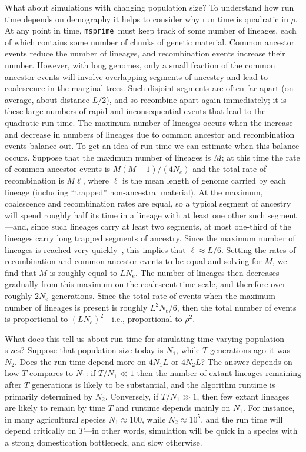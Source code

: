 \documentclass[9pt,twocolumn,twoside,lineno]{gsajnl}
\newcommand{\msprime}[0]{\texttt{msprime}}
\begin{document}
What about simulations with changing population size?
To understand how run time depends on demography
it helps to consider why run time is quadratic in $\rho$.
At any point in time, \msprime\ must keep track of some number of lineages,
each of which contains some number of chunks of genetic material.
Common ancestor events reduce the number of lineages,
and recombination events increase their number.
However, with long genomes,
only a small fraction of the common ancestor events
will involve overlapping segments of ancestry
and lead to coalescence in the marginal trees.
Such disjoint segments are often far apart (on average, about distance $L/2$),
and so recombine apart again immediately;
it is these large numbers of rapid and inconsequential events that
lead to the quadratic run time.
The maximum number of lineages occurs when
the increase and decrease in numbers of lineages due to
common ancestor and recombination events balance out.
To get an idea of run time we can estimate when this balance occurs.
Suppose that the maximum number of lineages is $M$;
at this time the rate of common ancestor events is $M (M-1) / (4 N_e)$
and the total rate of recombination is $M \ell$,
where $\ell$ is the mean length of genome carried by each lineage
(including ``trapped'' non-ancestral material).
At the maximum, coalescence and recombination rates are equal,
so a typical segment of ancestry will spend roughly half its time
in a lineage with at least one other such segment---and,
since such lineages carry at least two segments,
at most one-third of the lineages carry long trapped segments of ancestry.
Since the maximum number of lineages is reached
very quickly~\citep{nelson2020accounting},
this implies that $\ell \approx L / 6$.
Setting the rates of recombination and common ancestor events
to be equal and solving for $M$,
we find that $M$ is roughly equal to $L N_e$.
The number of lineages then decreases gradually from this maximum
on the coalescent time scale, and therefore over roughly $2 N_e$ generations.
Since the total rate of events when the maximum number of lineages is
present is roughly $L^2 N_e / 6$,
then the total number of events is proportional to $(L N_e)^2$---i.e.,
proportional to $\rho^2$.

What does this tell us about run time for simulating time-varying population sizes?
Suppose that population size today is $N_1$,
while $T$ generations ago it was $N_2$.
Does the run time depend more on $4 N_1 L$ or $4 N_2 L$?
The answer depends on how $T$ compares to $N_1$:
if $T / N_1 \ll 1$ then the number of extant lineages remaining after $T$
generations is likely to be substantial, and the algorithm runtime is primarily
determined by $N_2$. Conversely, if $T / N_1 \gg 1$, then few extant
lineages are likely to remain by time $T$ and runtime depends mainly on $N_1$.
For instance, in many agricultural species $N_1 \approx 100$, while $N_2
\approx 10^5$,
and the run time will depend critically on $T$---in other words,
simulation will be quick in a species with a strong domestication bottleneck,
and slow otherwise.
\end{document}
